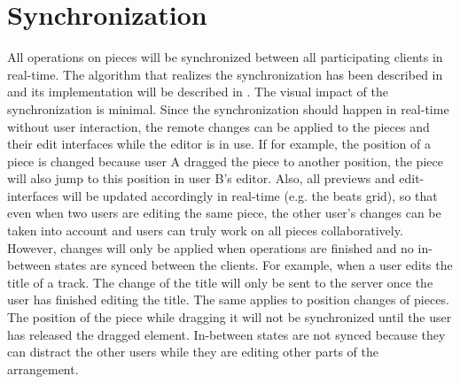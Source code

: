 \section{Synchronization}
\label{concept-synchronization}

All operations on pieces will be synchronized between all participating clients in real-time. The algorithm that realizes the synchronization has been described in  and its implementation will be described in . The visual impact of the synchronization is minimal. Since the synchronization should happen in real-time without user interaction, the remote changes can be applied to the pieces and their edit interfaces while the editor is in use. If for example, the position of a piece is changed because user A dragged the piece to another position, the piece will also jump to this position in user B's editor. Also, all previews and edit-interfaces will be updated accordingly in real-time (e.g. the beats grid), so that even when two users are editing the same piece, the other user's changes can be taken into account and users can truly work on all pieces collaboratively. However, changes will only be applied when operations are finished and no in-between states are synced between the clients. For example, when a user edits the title of a track. The change of the title will only be sent to the server once the user has finished editing the title. The same applies to position changes of pieces. The position of the piece while dragging it will not be synchronized until the user has released the dragged element. In-between states are not synced because they can distract the other users while they are editing other parts of the arrangement.